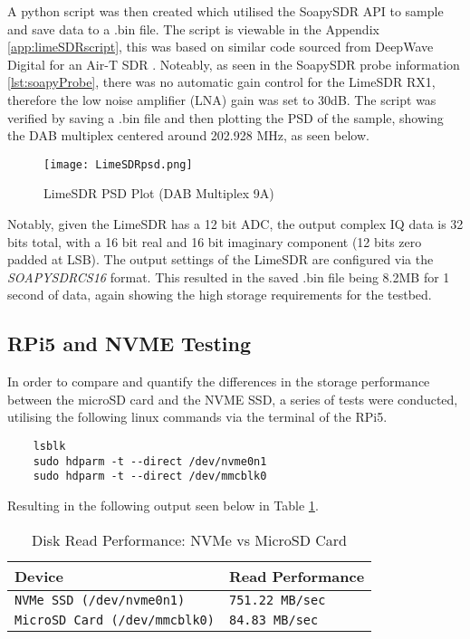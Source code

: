 \noindent A python script was then created which utilised the SoapySDR API to sample and save data to a .bin file. The script is viewable in the Appendix \ref{app:limeSDRscript}, this was based on similar code sourced from DeepWave Digital for an Air-T SDR \cite{complexSamplingPython}. Noteably, as seen in the SoapySDR probe information \ref{lst:soapyProbe}, there was no automatic gain control for the LimeSDR RX1, therefore the low noise amplifier (LNA) gain was set to 30dB. The script was verified by saving a .bin file and then plotting the PSD of the sample, showing the DAB multiplex centered around 202.928 MHz, as seen below. 

\begin{figure}[h!]
    \centering
    \texttt{[image: LimeSDRpsd.png]}
    \caption{LimeSDR PSD Plot (DAB Multiplex 9A)}
    \label{fig:limeSDRpsd}
\end{figure}

Notably, given the LimeSDR has a 12 bit ADC, the output complex IQ data is 32 bits total, with a 16 bit real and 16 bit imaginary component (12 bits zero padded at LSB). The output settings of the LimeSDR are configured via the \textit{SOAPYSDRCS16} format. This resulted in the saved .bin file being 8.2MB for 1 second of data, again showing the high storage requirements for the testbed.

\subsection{RPi5 and NVME Testing \label{sec:sbcVerification}}
In order to compare and quantify the differences in the storage performance between the microSD card and the NVME SSD, a series of tests were conducted, utilising the following linux commands via the terminal of the RPi5.

\begin{verbatim}
    lsblk
    sudo hdparm -t --direct /dev/nvme0n1 
    sudo hdparm -t --direct /dev/mmcblk0
\end{verbatim}

\noindent Resulting in the following output seen below in Table \ref{tab:diskperf}.

\begin{table}[h!]
    \centering
    \caption{Disk Read Performance: NVMe vs MicroSD Card \label{tab:diskperf}}
    \begin{tabular}{|l|l|}
    \hline
    \textbf{Device} & \textbf{Read Performance} \\ \hline
    \texttt{NVMe SSD (\texttt{/dev/nvme0n1})} & \texttt{751.22 MB/sec} \\ \hline
    \texttt{MicroSD Card (\texttt{/dev/mmcblk0})} & \texttt{84.83 MB/sec} \\ \hline
    \end{tabular}
\end{table}

